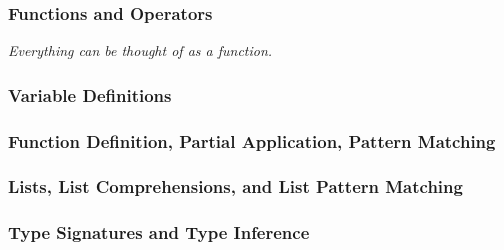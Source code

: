\begin{frame}[fragile]
  \frametitle{Functions and Operators}
  \pause
  
  \pause
  \emph{Everything can be thought of as a function.}
\end{frame}

\begin{frame}[fragile]
  \frametitle{Variable Definitions}
  \pause
  
\end{frame}

\begin{frame}[fragile]
  \frametitle{Function Definition, Partial Application, Pattern Matching}

  
\end{frame}

\begin{frame}[fragile]
    \frametitle{Lists, List Comprehensions, and List Pattern Matching}

    
\end{frame}

\begin{frame}[fragile]
  \frametitle{Type Signatures and Type Inference}

  
\end{frame}
